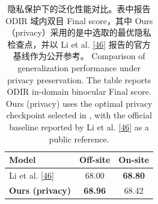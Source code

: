 \begin{table}[!htb]
\centering
\caption{隐私保护下的泛化性能对比。表中报告 ODIR 域内双目 Final score，其中 Ours（privacy）采用的是中选取的最优隐私检查点，并以 Li et al. \hyperref[_Ref213949402]{{[}46{]}} 报告的官方基线作为公开参考。 Comparison of generalization performance under privacy preservation. The table reports ODIR in-domain binocular Final score. Ours (privacy) uses the optimal privacy checkpoint selected in , with the official baseline reported by Li et al. \hyperref[_Ref213949402]{{[}46{]}} as a public reference.}
\label{tab:privacy-final}
\begin{tabular}{lcc}
\toprule
Model & Off-site & On-site \\
\midrule
Li et al. \hyperref[_Ref213949402]{{[}46{]}} & 68.00 & \textbf{68.80} \\
\textbf{Ours (privacy)} & \textbf{68.96} & 68.42 \\
\bottomrule
\end{tabular}
\end{table}
